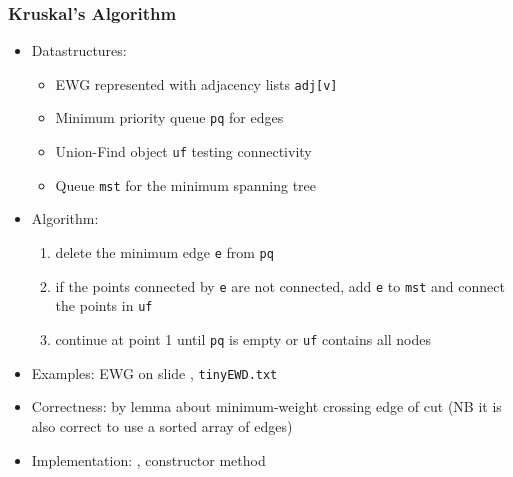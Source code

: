 \documentclass[handout]{beamer}
\begin{document}
\begin{frame}
    \frametitle{Kruskal's Algorithm}

\begin{itemize}[<+->]
\item Datastructures:
  \begin{itemize}
  \item EWG represented with adjacency lists {\tt adj[v]}
  \item Minimum priority queue {\tt pq} for edges
  \item Union-Find object {\tt uf} testing connectivity
  \item Queue {\tt mst} for the minimum spanning tree
\end{itemize}
\item Algorithm:
  \begin{enumerate}
  \item delete the minimum edge {\tt e} from {\tt pq}
  \item if the points connected by {\tt e} are not connected, 
  add {\tt e} to {\tt mst} and connect the points in {\tt uf}
  \item continue at point 1 until {\tt pq} is empty or {\tt uf} contains all nodes
  \end{enumerate}
  \item Examples: EWG on slide 
  \hyperlink{EWGexample}{\color{red}{\pageref{EWGexample}}}, {\tt tinyEWD.txt}
  \item Correctness: by lemma about minimum-weight crossing edge of cut
  (NB it is also correct to use a sorted array of edges)
  \item Implementation: \href{http://algs4.cs.princeton.edu/code/edu/princeton/cs/algs4/KruskalMST.java.html}%
{\color{red}{KruskalMST.java}}, constructor method
\end{itemize} 
\end{frame}
\end{document}
